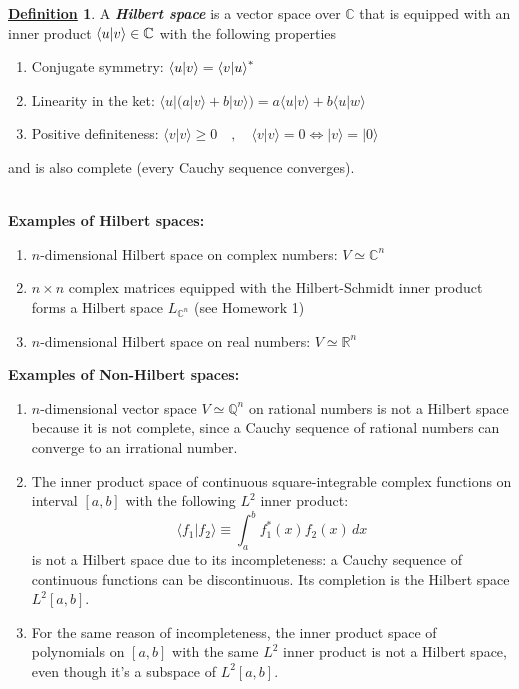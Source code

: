 \documentclass[11pt, answers]{exam}
\theoremstyle{definition}
\newtheorem{definition}{\underline{Definition}}[section]
\theoremstyle{bulleted}
\begin{document}
	\begin{definition}
			A \textbf{\textit{Hilbert space}} is a vector space over $\mathbb{C}$ that is equipped with an inner product $\braket{u|v}\in\mathbb{C}$ with the following properties
		\begin{enumerate}[label=(\arabic*)]
			\item Conjugate symmetry: $\braket{u|v} = \braket{v|u}^*$
			\item Linearity in the ket: $
			\langle u|\bigl(a|v\rangle+b|w\rangle\bigr)
			=a\langle u|v\rangle+b\langle u|w\rangle$
			\item Positive definiteness: $\langle v|v\rangle\geq 0\quad,
			\quad
			\langle v|v\rangle=0
			\iff |v\rangle=|0\rangle$
		\end{enumerate}
		and is also complete (every Cauchy sequence converges).
	\end{definition}
	\ \\
	\textbf{Examples of Hilbert spaces:}
	\begin{enumerate}[label=(\roman*)]
		\item \(n\)-dimensional Hilbert space on complex numbers: \(V\simeq\mathbb C^n\)
		\item \(n\times n\) complex matrices equipped with the Hilbert-Schmidt inner product forms a Hilbert space \(L_{\mathbb C^n}\) (see Homework 1)
		\item \(n\)-dimensional Hilbert space on real numbers: \(V\simeq\mathbb R^n\)
	\end{enumerate}
	\textbf{Examples of Non-Hilbert spaces:}
	\begin{enumerate}[label=(\roman*)]
		\item \(n\)-dimensional vector space \(V\simeq\mathbb Q^n\) on rational numbers is not a Hilbert space because it is not complete, since a Cauchy sequence of rational numbers can converge to an irrational number.
		\item The inner product space of continuous square-integrable complex functions on interval \([a,b]\) with the following \(L^2\) inner product:\[
		\langle f_1|f_2\rangle\equiv\int_a^b f_1^*(x)f_2(x)\,dx \tag{1.39}
		\]
		is not a Hilbert space due to its incompleteness: a Cauchy sequence of continuous functions can be discontinuous. Its completion is the Hilbert space \(L^2[a,b]\).
		\item For the same reason of incompleteness, the inner product space of polynomials on \([a,b]\) with the same \(L^2\) inner product is not a Hilbert space, even though it’s a subspace of \(L^2[a,b]\).
	\end{enumerate}
\end{document}
